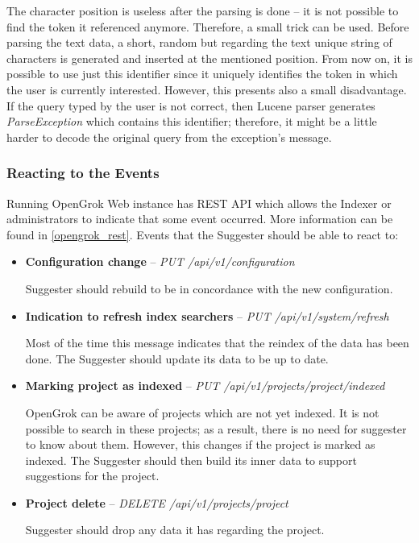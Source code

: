 The character position is
useless after the parsing is done – it is not possible to find the token it referenced anymore. Therefore, a small
trick can be used. Before parsing the text data, a short, random but regarding the text unique string of characters
is generated and inserted at the mentioned position. From now on, it is possible to use just this identifier since it
uniquely identifies the token in which the user is currently interested. However, this presents also a small disadvantage.
If the query typed by the user is not correct, then Lucene parser generates \textit{ParseException} which contains
this identifier; therefore, it might be a little harder to decode the original query from the exception's message.

\subsubsection{Reacting to the Events}

Running OpenGrok Web instance has REST API which allows the Indexer or administrators to indicate that some event occurred.
More information can be found in \ref{opengrok_rest}. Events that the Suggester should be able to react to:
\begin{itemize}
    \item \textbf{Configuration change} – \textit{PUT /api/v1/configuration}

    Suggester should rebuild to be in concordance with the new configuration.
    \item \textbf{Indication to refresh index searchers} – \textit{PUT /api/v1/system/refresh}

    Most of the time this message indicates that the reindex of the data has been done. The Suggester
    should update its data to be up to date.

    \item \textbf{Marking project as indexed} – \textit{PUT /api/v1/projects/{project}/indexed}

    OpenGrok can be aware of projects which are not yet indexed. It is not possible to search in these projects;
    as a result, there is no need for suggester to know about them. However, this changes if the project is marked as indexed.
    The Suggester should then build its inner data to support suggestions for the project.

    \item \textbf{Project delete} – \textit{DELETE /api/v1/projects/{project}}

    Suggester should drop any data it has regarding the project.
\end{itemize}

